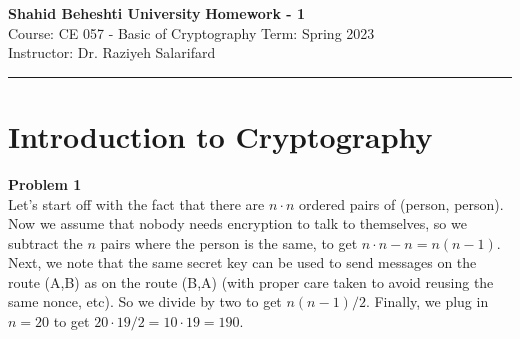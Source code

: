 \documentclass[a4paper, 11pt]{article}
\newenvironment{problem}[2][Problem]
    { \begin{mdframed}[backgroundcolor=gray!20] \textbf{#1 #2} \\}
    {  \end{mdframed}}
\begin{document}
\noindent
\large\textbf{Shahid Beheshti University } \hfill \textbf{Homework - 1}   \\
\normalsize Course: CE 057 - Basic of Cryptography \hfill Term: Spring 2023\\
Instructor: Dr. Raziyeh Salarifard\\
\noindent\rule{7in}{2.8pt}

\section*{Introduction to Cryptography}
\begin{problem}{1}
Let's start off with the fact that there are $n\cdot n$ ordered pairs of (person, person). Now we assume that nobody needs encryption to talk to themselves, so we subtract the $n$ pairs where the person is the same, to get $n\cdot n-n=n(n-1)$. Next, we note that the same secret key can be used to send messages on the route (A,B) as on the route (B,A) (with proper care taken to avoid reusing the same nonce, etc). So we divide by two to get $n(n-1)/2$. Finally, we plug in $n=20$ to get $20\cdot 19/2=10\cdot 19=190$.
\end{problem}
\end{document}
